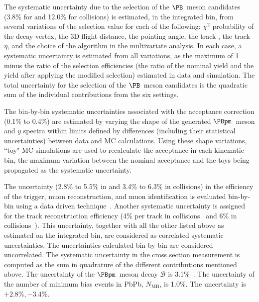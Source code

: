 The systematic uncertainty due to the selection of the $\PB$~meson candidates (3.8\% for \pp and 12.0\% for \PbPb collisions) is estimated, in the \pt integrated bin, from several variations of the selection value for each of the following: $\chi^{2}$ probability of the decay vertex, the 3D flight distance, the pointing angle, the track \pt, the track $\eta$, and the choice of the algorithm in the multivariate analysis. In each case, a systematic uncertainty is estimated from all variations, as the maximum of 1 minus the ratio of the selection efficiencies (the ratio of the nominal yield and the yield after applying the modified selection) estimated in data and simulation. The total uncertainty for the selection of the $\PB$~meson candidates is the quadratic sum of the individual contributions from the six settings.

The bin-by-bin systematic uncertainties associated with the acceptance correction (0.1\% to 0.4\%) are estimated by varying the shape of the generated $\PBpm$~meson \pt and $y$ spectra within limits defined by differences (including their statistical uncertainties) between data and MC calculations. Using these shape variations, ``toy" MC simulations are used to recalculate the acceptance in each kinematic bin, the maximum variation between the nominal acceptance and the toys being propagated as the systematic uncertainty.

The uncertainty (2.8\% to 5.5\% in \pp and 3.4\% to 6.3\% in \PbPb collisions) in the efficiency of the trigger, muon reconstruction, and muon identification is evaluated bin-by-bin using a data driven technique~\cite{Khachatryan:2010xn}.
Another systematic uncertainty is assigned for the track reconstruction efficiency (4\% per track in \pp collisions~\cite{TRK-11-001} and 6\% in \PbPb collisions~\cite{Khachatryan:2016odn}). This uncertainty, together with all the other listed above as estimated on the \pt integrated bin, are considered as correlated systematic uncertainties. The uncertainties calculated bin-by-bin are considered uncorrelated.
The systematic uncertainty in the cross section measurement is computed as the sum in quadrature of the different contributions mentioned above. The uncertainty of the $\PBpm$~meson decay $\mathcal{B}$ is 3.1\%~\cite{pdg:2016}. The uncertainty of the number of minimum bias events in PbPb, $N_{\text{MB}}$, is 1.0\%. The \TAA uncertainty is $+2.8\%, -3.4\%$.

